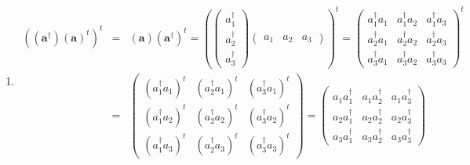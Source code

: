\documentclass[aps,preprint]{revtex4}
\begin{document}
\begin{enumerate}
\begin{enumerate}
\begin{enumerate}
\item 
\begin{eqnarray}
\left( \overset{}{\left( \mathbf{a}^{\dagger }\right) \left( \mathbf{a}%
\right) ^{t}}\right) ^{t} &=&\left( \mathbf{a}\right) \left( \mathbf{a}%
^{\dagger }\right) ^{t}=\left( \left( 
\begin{array}{c}
a_{1}^{\dagger } \\ 
a_{2}^{\dagger } \\ 
a_{3}^{\dagger }%
\end{array}%
\right) \left( 
\begin{array}{ccc}
a_{1} & a_{2} & a_{3}%
\end{array}%
\right) \right) ^{t}=\left( 
\begin{array}{ccc}
a_{1}^{\dagger }a_{1} & a_{1}^{\dagger }a_{2} & a_{1}^{\dagger }a_{3} \\ 
a_{2}^{\dagger }a_{1} & a_{2}^{\dagger }a_{2} & a_{2}^{\dagger }a_{3} \\ 
a_{3}^{\dagger }a_{1} & a_{3}^{\dagger }a_{2} & a_{3}^{\dagger }a_{3}%
\end{array}%
\right) ^{t} \\
&=&\left( 
\begin{array}{ccc}
\left( a_{1}^{\dagger }a_{1}\right) ^{t} & \left( a_{2}^{\dagger
}a_{1}\right) ^{t} & \left( a_{3}^{\dagger }a_{1}\right) ^{t} \\ 
\left( a_{1}^{\dagger }a_{2}\right) ^{t} & \left( a_{2}^{\dagger
}a_{2}\right) ^{t} & \left( a_{3}^{\dagger }a_{2}\right) ^{t} \\ 
\left( a_{1}^{\dagger }a_{3}\right) ^{t} & \left( a_{2}^{\dagger
}a_{3}\right) ^{t} & \left( a_{3}^{\dagger }a_{3}\right) ^{t}%
\end{array}%
\right) =\left( 
\begin{array}{ccc}
a_{1}a_{1}^{\dagger } & a_{1}a_{2}^{\dagger } & a_{1}a_{3}^{\dagger } \\ 
a_{2}a_{1}^{\dagger } & a_{2}a_{2}^{\dagger } & a_{2}a_{3}^{\dagger } \\ 
a_{3}a_{1}^{\dagger } & a_{3}a_{2}^{\dagger } & a_{3}a_{3}^{\dagger }%
\end{array}%
\right)
\end{eqnarray}


\end{enumerate}
\end{enumerate}
\end{enumerate}
\end{document}
